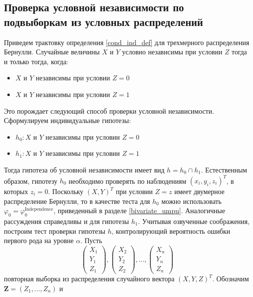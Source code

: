 \begin{centering}
    \subsection{Проверка условной независимости по подвыборкам из условных распределений}\label{twos}
\end{centering}

Приведем трактовку определения \ref{cond_ind_def} для трехмерного
распределения Бернулли. Случайные величины $X$ и $Y$
условно независимы при условии $Z$ тогда и только тогда,
когда:
\begin{itemize}
    \item $X$ и $Y$ независимы при условии $Z=0$
    \item $X$ и $Y$  независимы при условии $Z=1$
\end{itemize}
Это порождает следующий способ проверки условной независимости. 
Сформулируем индивидуальные гипотезы:
\begin{itemize}
    \item $h_0 : X$ и $Y$ независимы при условии $Z=0$
    \item $h_1 : X$ и $Y$ независимы при условии $Z=1$
\end{itemize}
Тогда гипотеза об условной независимости имеет вид 
$h = h_0 \cap h_1$. Естественным образом, гипотезу 
$h_0$ необходимо проверять по наблюдениям
$(x_i,y_i,z_i)^T$, в которых $z_i=0$. Поскольку $(X,Y)^T$ при условии
$Z=z$ имеет двумерное распределение Бернулли, то
в качестве теста для $h_0$ можно использовать
$\varphi_0 = \varphi^{\text{Independence}}_0$, 
приведенный в разделе \ref{bivariate_umpu}. Аналогичные рассуждения 
справедливы и для гипотезы $h_1$. Учитывая озвученные соображения,
построим тест проверки гипотезы $h$, контролирующий вероятность
ошибки первого рода на уровне $\alpha$.
Пусть
$$
\begin{pmatrix}
        X_1 \\
        Y_1 \\
        Z_1
    \end{pmatrix},
    \begin{pmatrix}
        X_2 \\
        Y_2 \\
        Z_2
    \end{pmatrix}, \ldots,
    \begin{pmatrix}
        X_n \\
        Y_n \\
        Z_n
    \end{pmatrix}
$$ повторная выборка из распределения случайного вектора $(X,Y,Z)^T$. Обозначим $\mathbf{Z}=(Z_1,\ldots,Z_n)$ и 
